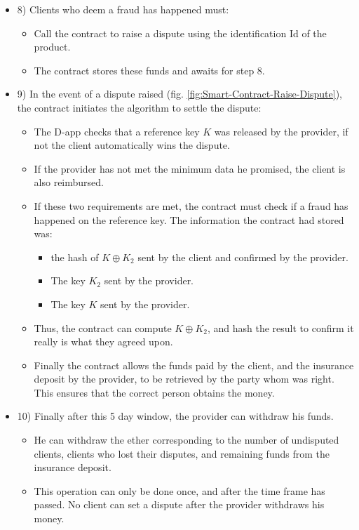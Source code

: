 \documentclass[conference]{IEEEtran}
\begin{document}
\begin{itemize}
    \item 8) Clients who deem a fraud has happened must:
        \begin{itemize}
            \item Call the contract to raise a dispute using the identification Id of the product.
            \item The contract stores these funds and awaits for step 8.
        \end{itemize}
    \item 9) In the event of a dispute raised (fig. \ref{fig:Smart-Contract-Raise-Dispute}), the contract initiates the algorithm to settle the dispute:
    \begin{itemize}
        \item The D-app checks that a reference key $K$ was released by the provider, if not the client automatically wins the dispute.
        \item If the provider has not met the minimum data he promised, the client is also reimbursed. 
        \item If these two requirements are met, the contract must check if a fraud has happened on the reference key. The information the contract had stored was:
            \begin{itemize}
            \item the hash of $ K \oplus K_2 $ sent by the client and confirmed by the provider.
            \item The key $K_2$ sent by the provider.
            \item The key $K$ sent by the provider.
            \end{itemize}
        \item Thus, the contract can compute $ K \oplus K_2 $, and hash the result to confirm it really is what they agreed upon.

        \item Finally the contract allows the funds paid by the client, and the insurance deposit by the provider, to be retrieved by the party whom was right. This ensures that the correct person obtains the money.
    \end{itemize}
    \item 10) Finally after this 5 day window, the provider can withdraw his funds.
    \begin{itemize}
        \item He can withdraw the ether corresponding to the number of undisputed clients, clients who lost their disputes, and remaining funds from the insurance deposit.
        \item This operation can only be done once, and after the time frame has passed. No client can set a dispute after the provider withdraws his money.
 
    \end{itemize}
\end{itemize}
\end{document}
